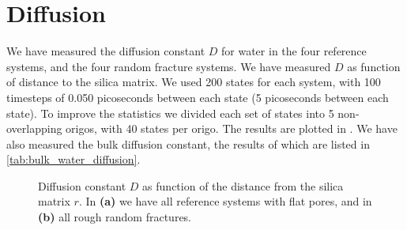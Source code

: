 \section{Diffusion}
%

%

We have measured the diffusion constant $D$ for water in the four reference systems, and the four random fracture systems. We have measured $D$ as function of distance to the silica matrix. We used 200 states for each system, with 100 timesteps of 0.050 picoseconds between each state (5 picoseconds between each state). To improve the statistics we divided each set of states into 5 non-overlapping origos, with 40 states per origo. The results are plotted in . We have also measured the bulk diffusion constant, the results of which are listed in \cref{tab:bulk_water_diffusion}.
%
\begin{figure}[!htb]%
\setlength{\myfigwidth}{0.58\textwidth}%
%
\caption{%
    Diffusion constant $D$ as function of the distance from the silica matrix $r$. In \textbf{(a)} we have all reference systems with flat pores, and in \textbf{(b)} all rough random fractures.
    \label{fig:first_diffusion_figure}%
}%
\end{figure}%

